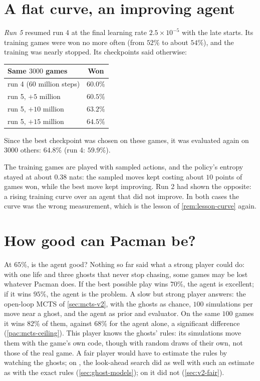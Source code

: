 \section{A flat curve, an improving agent}

\emph{Run 5} resumed run 4 at the final learning rate $2.5 \times 10^{-5}$
with the late starts. Its training games were won no more often (from
$52\%$ to about $54\%$), and the training was nearly stopped. Its
checkpoints said otherwise:
\begin{center}
  \begin{tabular}{@{}lc@{}}
    \toprule
    Same $3000$ games & Won \\
    \midrule
    run 4 ($60$ million steps) & $60.0\%$ \\
    run 5, $+5$ million & $60.5\%$ \\
    run 5, $+10$ million & $63.2\%$ \\
    run 5, $+15$ million & $64.5\%$ \\
    \bottomrule
  \end{tabular}
\end{center}
Since the best checkpoint was chosen on these games, it was evaluated again
on $3000$ others: $64.8\%$ (run 4: $59.9\%$).

The training games are played with sampled actions, and the policy's
entropy stayed at about $0.38$ nats: the sampled moves kept costing about
$10$ points of games won, while the best move kept improving. Run 2 had
shown the opposite: a rising training curve over an agent that did not
improve. In both cases the curve was the wrong measurement, which is the
lesson of \cref{rem:lesson-curve} again.

\section{How good can Pacman be?}

At $65\%$, is the agent good? Nothing so far said what a strong player could
do: with one life and three ghosts that never stop chasing, some games may
be lost whatever Pacman does. If the best possible play wins $70\%$, the
agent is excellent; if it wins $95\%$, the agent is the problem. A slow but
strong player answers: the open-loop MCTS of \cref{sec:mcts-v2}, with the
ghosts as chance, $100$ simulations per move near a ghost, and the agent as
prior and evaluator. On the same $100$ games it wins $82\%$ of them, against
$68\%$ for the agent alone, a significant difference
(\cref{pac:mcts-ceiling}). This player knows the ghosts' rules: its
simulations move them with the game's own code, though with random draws of
their own, not those of the real game. A fair player would have to estimate
the rules by watching the ghosts; on , the look-ahead search did as
well with such an estimate as with the exact rules (\cref{sec:ghost-models});
on  it did not (\cref{sec:v2-fair}).

